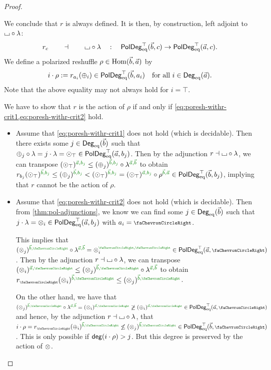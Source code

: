 \documentclass[a4paper]{memoir}
\begin{document}
\begin{proof}
\begin{enumerate}
		We conclude that $r$ is always defined.
		It is then, by construction, left adjoint to ${\llcorner\hspace{-.4ex}\lrcorner} \circ \lambda$:
		\begin{equation}
			r_c \qquad \dashv \qquad {\llcorner\hspace{-.4ex}\lrcorner} \circ \lambda \quad : \quad  \mathsf{PolDeg}_{\mathrm{eq}}^\top(\vec b, c) \to \mathsf{PolDeg}_{\mathrm{eq}}^\top(\vec a, c).
		\end{equation}
		We define a polarized reshuffle $\rho \in {\mathrm{Hom}}(\vec b, \vec a)$ by
		\begin{equation} \label{eq:poresh-adjoint:def-rho}
			i \cdot \rho := r_{a_i}({\oplus}_i) \in \mathsf{PolDeg}_{\mathrm{eq}}^\top(\vec b, a_i)
			\quad \text{for all $i \in {\mathsf{Deg}_{\mathrm{eq}}}(\vec a)$}.
		\end{equation}
		Note that the above equality may not always hold for $i = \top$.
		
		We have to show that $r$ is the action of $\rho$ if and only if \cref{eq:poresh-withr-crit1,eq:poresh-withr-crit2} hold.
		\begin{itemize}
			\item Assume that \cref{eq:poresh-withr-crit1} does not hold (which is decidable).
			Then there exists some $j \in {\mathsf{Deg}_{\mathrm{eq}}}(\vec b)$ such that ${\oplus}_j \circ \lambda = j \cdot \lambda = {\odot}_\top \in \mathsf{PolDeg}_{\mathrm{eq}}^\top(\vec a, b_j)$.
			Then by the adjunction $r \dashv {\llcorner\hspace{-.4ex}\lrcorner} \circ \lambda$, we can transpose $(\nonpol_\top)\pmrhom{\vec a}{b_j} \leq (\pospol_j)\pmrhom{\vec b}{b_j} \circ \lambda\pmrhom{\vec a}{\vec b}$ to obtain
			$r_{b_j}(\nonpol_\top)\pmrhom{\vec b}{b_j} \leq (\pospol_j)\pmrhom{\vec b}{b_j} < (\nonpol_\top)\pmrhom{\vec b}{b_j} = (\nonpol_\top)\pmrhom{\vec a}{b_j} \circ \rho\pmrhom{\vec b}{\vec a} \in \poldegeqtop(\vec b, b_j)$, implying that $r$ cannot be the action of $\rho$.
			
			\item Assume that \cref{eq:poresh-withr-crit2} does not hold (which is decidable).
			Then from \cref{thm:pol-adjunctions}, we know we can find some $j \in {\mathsf{Deg}_{\mathrm{eq}}}(\vec b)$ such that $j \cdot \lambda = {\otimes}_i \in \mathsf{PolDeg}_{\mathrm{eq}}^\top(\vec a, b_j)$ with $a_i = \ypolar$.
			
			This implies that $(\mixpol_j)\pmrhom{\vec b}{\ypolar} \circ \lambda\pmrhom{\vec a}{\vec b} = \mixpol_i\pmryy \in \poldegeqtop(\vec a, \ypolar)$.
			Then by the adjunction $r \dashv {\llcorner\hspace{-.4ex}\lrcorner} \circ \lambda$, we can transpose $(\mixpol_i)\pmrhom{\vec a}{\ypolar} \leq (\mixpol_j)\pmrhom{\vec b}{\ypolar} \circ \lambda\pmrhom{\vec a}{\vec b}$ to obtain
			$r_\ypolar(\mixpol_i)\pmrhom{\vec b}{\ypolar} \leq (\mixpol_j)\pmrhom{\vec b}{\ypolar}$.
			
			On the other hand, we have that $(\mixpol_j)\pmrhom{\vec b}{\ypolar} \circ \lambda\pmrhom{\vec a}{\vec b} = (\mixpol_i)\pmrhom{\vec a}{\ypolar} \not \geq (\pospol_i)\pmrhom{\vec a}{\ypolar} \in \poldegeqtop(\vec a, \ypolar)$ and hence, by the adjunction $r \dashv {\llcorner\hspace{-.4ex}\lrcorner} \circ \lambda$, that $i \cdot \rho = r_\ypolar(\pospol_i)\pmrhom{\vec b}{\ypolar} \not\leq (\mixpol_j)\pmrhom{\vec b}{\ypolar} \in \poldegeqtop(\vec b, \ypolar)$.
			This is only possible if $\mathsf{deg}(i \cdot \rho) > j$.
			But this degree is preserved by the action of ${\otimes}$.
			

\end{itemize}
\end{enumerate}
\end{proof}
\end{document}
